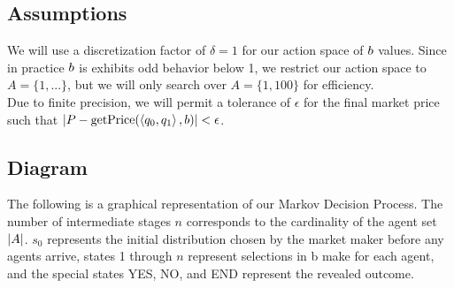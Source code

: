 \subsection{Assumptions}

We will use a discretization factor of $\delta=1$ for our action space of $b$ values. Since in practice $b$ is exhibits odd behavior below 1, we restrict our action space to $A=\{1,...\}$, but we will only search over $A=\{1,100\}$ for efficiency.\\

Due to finite precision, we will permit a tolerance of $\epsilon$ for the final market price such that $|P - \text{getPrice}(\left<{q_0}, {q_1}\right>, b)| < \epsilon$.\\


\subsection{Diagram}
The following is a graphical representation of our Markov Decision Process. The number of intermediate stages $n$ corresponds to the cardinality of the agent set $|A|$. $s_0$ represents the initial distribution chosen by the market maker before any agents arrive, states 1 through $n$ represent selections in b make for each agent, and the special states YES, NO, and END represent the revealed outcome. \\

